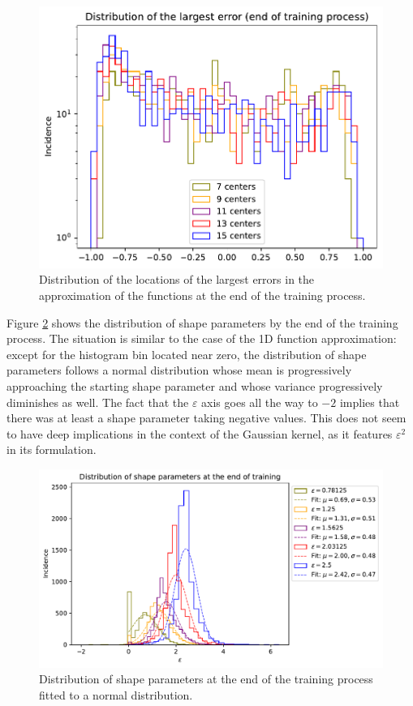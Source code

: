 \documentclass[12pt]{report} %
\begin{document}
\begin{figure}[h]
  \includegraphics[width=.7\textwidth]{imagenes/experiments/1d/ode/distribution_of_errors_L_inf_end.pdf}
  \caption{Distribution of the locations of the largest errors in the approximation of the functions at the end of the training process.}
  \label{fig:ode-1d-results-largest-error}
\end{figure}

Figure \ref{fig:ode-1d-results-shape-parameters} shows the distribution of shape parameters by the end of the training process. The situation is similar to the case of the 1D function approximation: except for the histogram bin located near zero, the distribution of shape parameters follows a normal distribution whose mean is progressively approaching the starting shape parameter and whose variance progressively diminishes as well. The fact that the $\varepsilon$ axis goes all the way to $-2$ implies that there was at least a shape parameter taking negative values. This does not seem to have deep implications in the context of the Gaussian kernel, as it features $\varepsilon^2$ in its formulation.

\begin{figure}[h]
  \includegraphics[width=\textwidth]{imagenes/experiments/1d/ode/distribution_of_shape_parameters_at_end_of_training.pdf}
  \caption{Distribution of shape parameters at the end of the training process fitted to a normal distribution.}
  \label{fig:ode-1d-results-shape-parameters}
\end{figure}
\end{document}
